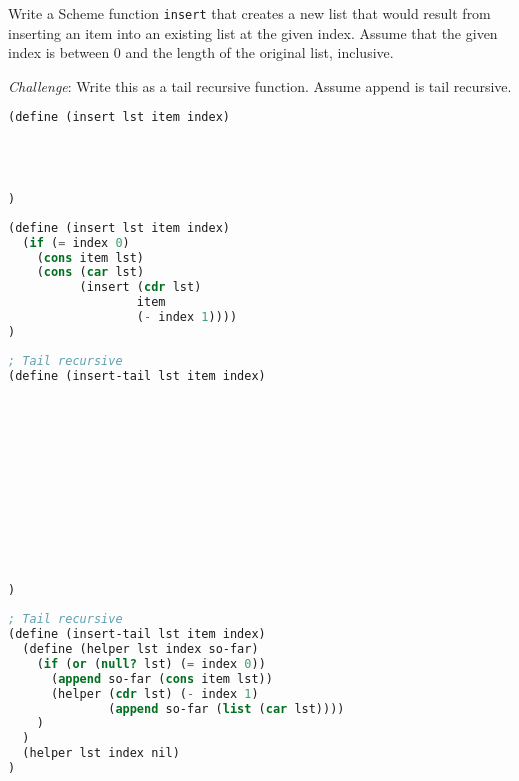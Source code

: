 \begin{blocksection}
\question Write a Scheme function \texttt{insert} that creates a new list that would result from inserting an item into an existing list at the given index.
Assume that the given index is between 0 and the length of the original list, inclusive.

\emph{Challenge}: Write this as a tail recursive function. Assume append is tail recursive.

\begin{lstlisting}[language=Scheme]
(define (insert lst item index)




)
\end{lstlisting}

\begin{solution}[0.5in]
\begin{lstlisting}[language=Scheme]
(define (insert lst item index)
  (if (= index 0)
    (cons item lst)
    (cons (car lst) 
          (insert (cdr lst) 
                  item 
                  (- index 1))))
)
\end{lstlisting}
\end{solution}

\begin{lstlisting}[language=Scheme]
; Tail recursive
(define (insert-tail lst item index)












)
\end{lstlisting}

\begin{solution}
\begin{lstlisting}[language=Scheme]
; Tail recursive
(define (insert-tail lst item index)
  (define (helper lst index so-far)
    (if (or (null? lst) (= index 0))
      (append so-far (cons item lst))
      (helper (cdr lst) (- index 1)
              (append so-far (list (car lst))))
    )
  )
  (helper lst index nil)
)
\end{lstlisting}
\end{solution}
\end{blocksection}
